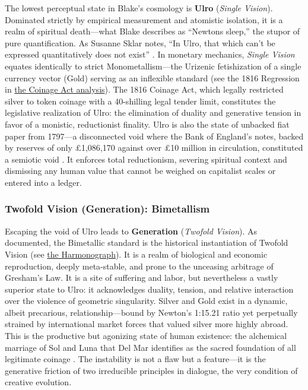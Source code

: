 \documentclass[
]{article}
\begin{document}
The lowest perceptual state in Blake's cosmology is \textbf{Ulro}
(\emph{Single Vision}). Dominated strictly by empirical measurement and
atomistic isolation, it is a realm of spiritual death---what Blake
describes as ``Newtons sleep,'' the stupor of pure quantification. As
Susanne Sklar notes, ``In Ulro, that which can't be expressed
quantitatively does not exist'' \citep{sklar2011blake}. In monetary
mechanics, \emph{Single Vision} equates identically to strict
Monometallism---the Urizenic fetishization of a single currency vector
(Gold) serving as an inflexible standard (see the 1816 Regression in
\href{04b_coinage_act_1816.md\#the-1816-coinage-act-as-topological-regression}{the
Coinage Act analysis}). The 1816 Coinage Act, which legally restricted
silver to token coinage with a 40-shilling legal tender limit,
constitutes the legislative realization of Ulro: the elimination of
duality and generative tension in favor of a monistic, reductionist
finality. Ulro is also the state of unbacked fiat paper from 1797---a
disconnected void where the Bank of England's notes, backed by reserves
of only £1,086,170 against over £10 million in circulation, constituted
a semiotic void \citep{clapham1944bank}. It enforces total reductionism,
severing spiritual context and dismissing any human value that cannot be
weighed on capitalist scales or entered into a ledger.

\subsubsection{Twofold Vision (Generation):
Bimetallism}\label{twofold-vision-generation-bimetallism}

Escaping the void of Ulro leads to \textbf{Generation} (\emph{Twofold
Vision}). As documented, the Bimetallic standard is the historical
instantiation of Twofold Vision (see \hyperref[fig-alchemy]{the
Harmonograph}). It is a realm of biological and economic reproduction,
deeply meta-stable, and prone to the unceasing arbitrage of Gresham's
Law. It is a site of suffering and labor, but nevertheless a vastly
superior state to Ulro: it acknowledges duality, tension, and relative
interaction over the violence of geometric singularity. Silver and Gold
exist in a dynamic, albeit precarious, relationship---bound by Newton's
1:15.21 ratio yet perpetually strained by international market forces
that valued silver more highly abroad. This is the productive but
agonizing state of human existence: the alchemical marriage of Sol and
Luna that Del Mar identifies as the sacred foundation of all legitimate
coinage \citep{delmar1895history}. The instability is not a flaw but a
feature---it is the generative friction of two irreducible principles in
dialogue, the very condition of creative evolution.
\end{document}
